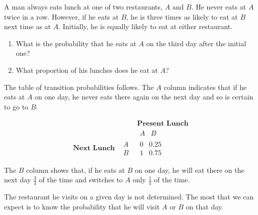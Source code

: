 \documentclass{ximera}
\begin{document}
\begin{example}\label{007199}
A man always eats lunch at one of two restaurants, $A$ and $B$. He never eats at $A$ twice in a row. However, if he eats at $B$, he is three times as likely to eat at $B$ next time as at $A$. Initially, he is equally likely to eat at either restaurant.


\begin{enumerate}
\item What is the probability that he eats at $A$ on the third day after the initial one?

\item What proportion of his lunches does he eat at $A$?

\end{enumerate}

 \begin{explanation}
  The table of transition probabilities follows. The $A$ column indicates that if he eats at $A$ on one day, he never eats there again on the next day and so is certain to go to $B$.
  
 
 $$
\begin{array}{cc|c}
   & & \textbf{Present Lunch} \\  
   &  &  \begin{array}{cc} A & B \end{array}  \\
   \hline
\textbf{Next Lunch} &   \begin{array}{c} A\\ B\end{array} & \begin{array}{cc} 0 &0.25\\1 & 0.75 \end{array} 
 \end{array}
 $$
 

The $B$ column shows that, if he eats at $B$ on one day, he will eat there on the next day $\frac{3}{4}$ of the time and switches to $A$ only $\frac{1}{4}$ of the time.


The restaurant he visits on a given day is not determined. The most that we can expect is to know the probability that he will visit $A$ or $B$ on that day.


\end{explanation}
\end{example}
\end{document}
